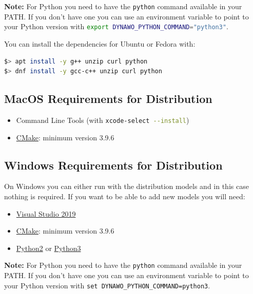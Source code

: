 \documentclass[a4paper, 12pt]{report}
\begin{document}
\textbf{Note:} For Python you need to have the \lstinline[language=bash]{python} command available in your PATH. If you don't have one you can use an environment variable to point to your Python version with \lstinline[language=bash]{export DYNAWO_PYTHON_COMMAND="python3"}.

You can install the dependencies for Ubuntu or Fedora with:
\begin{lstlisting}[language=bash]
$> apt install -y g++ unzip curl python
$> dnf install -y gcc-c++ unzip curl python
\end{lstlisting}


\subsection{MacOS Requirements for Distribution}

\begin{itemize}
\item Command Line Tools (with \lstinline[language=bash]{xcode-select --install})
\item \href{https://cmake.org/}{CMake}: minimum version 3.9.6
\end{itemize}

\subsection{Windows Requirements for Distribution}

On Windows you can either run \Dynawo with the distribution models and in this case nothing is required. If you want to be able to add new models you will need:

\begin{itemize}
\item \href{https://visualstudio.microsoft.com}{Visual Studio 2019}
\item \href{https://cmake.org/}{CMake}: minimum version 3.9.6
\item \href{https://www.python.org/ftp/python/2.7.18/python-2.7.18.amd64.msi}{Python2} or \href{https://www.python.org/ftp/python/3.8.2/python-3.8.2-amd64.exe}{Python3}
\end{itemize}

\textbf{Note:} For Python you need to have the \lstinline[language=bash]{python} command available in your PATH. If you don't have one you can use an environment variable to point to your Python version with \lstinline[language=command.com]{set DYNAWO_PYTHON_COMMAND=python3}.
\end{document}

